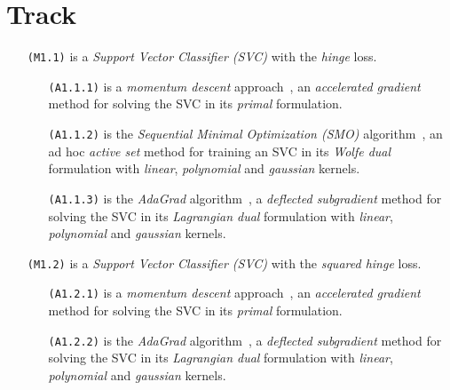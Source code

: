 \section{Track}

\begin{itemize}
\item[\texttt{(M1.1)}] is a \emph{Support Vector Classifier (SVC)} with the \emph{hinge} loss.

\begin{itemize}
\item[\texttt{(A1.1.1)}] is a \emph{momentum descent} approach~\cite{polyak1964some, nesterov1998introductory, nesterov1983method}, an \emph{accelerated gradient} method for solving the SVC in its \emph{primal} formulation.

\item[\texttt{(A1.1.2)}] is the \emph{Sequential Minimal Optimization (SMO)} algorithm~\cite{platt1998sequential, keerthi2001improvements}, an ad hoc \emph{active set} method for training an SVC in its \emph{Wolfe dual} formulation with \emph{linear}, \emph{polynomial} and \emph{gaussian} kernels.

\item[\texttt{(A1.1.3)}] is the \emph{AdaGrad} algorithm~\cite{duchi2011adaptive}, a \emph{deflected subgradient} method for solving the SVC in its \emph{Lagrangian dual} formulation with \emph{linear}, \emph{polynomial} and \emph{gaussian} kernels.
\end{itemize}

\end{itemize}

\begin{itemize}
\item[\texttt{(M1.2)}] is a \emph{Support Vector Classifier (SVC)} with the \emph{squared hinge} loss.

\begin{itemize}
\item[\texttt{(A1.2.1)}] is a \emph{momentum descent} approach~\cite{polyak1964some, nesterov1998introductory, nesterov1983method}, an \emph{accelerated gradient} method for solving the SVC in its \emph{primal} formulation.

\item[\texttt{(A1.2.2)}] is the \emph{AdaGrad} algorithm~\cite{duchi2011adaptive}, a \emph{deflected subgradient} method for solving the SVC in its \emph{Lagrangian dual} formulation with \emph{linear}, \emph{polynomial} and \emph{gaussian} kernels.
\end{itemize}

\end{itemize}

